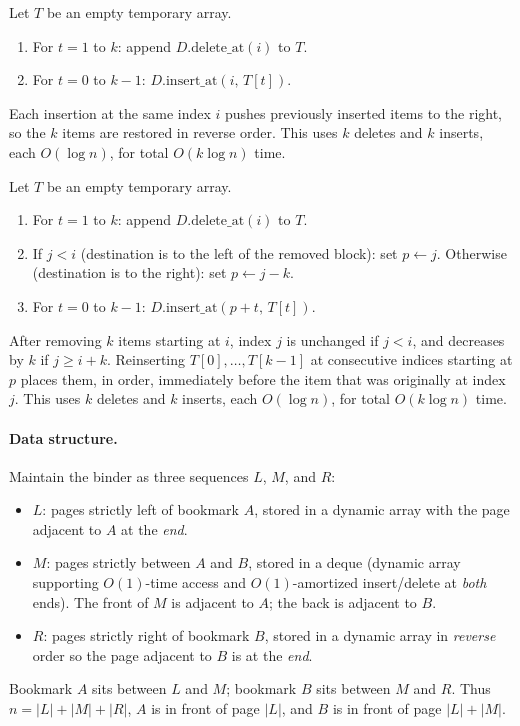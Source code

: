\documentclass[12pt,twoside]{article}
\begin{document}
\begin{problems}
\newpage
\problem  %

\begin{problemparts}
\problempart %
Let $T$ be an empty temporary array.
\begin{enumerate}
    \item For $t = 1$ to $k$: append $D.\mathrm{delete\_at}(i)$ to $T$.
    \item For $t = 0$ to $k-1$: $D.\mathrm{insert\_at}(i,\, T[t])$.
\end{enumerate}
Each insertion at the same index $i$ pushes previously inserted items to the right, so the $k$ items are restored in reverse order.
This uses $k$ deletes and $k$ inserts, each $O(\log n)$, for total $O(k\log n)$ time.

\problempart %
Let $T$ be an empty temporary array.
\begin{enumerate}
    \item For $t = 1$ to $k$: append $D.\mathrm{delete\_at}(i)$ to $T$.
    \item If $j < i$ (destination is to the left of the removed block):
        set $p \leftarrow j$.
        Otherwise (destination is to the right):
        set $p \leftarrow j - k$.
    \item For $t = 0$ to $k-1$: $D.\mathrm{insert\_at}(p + t,\, T[t])$.
\end{enumerate}
After removing $k$ items starting at $i$, index $j$ is unchanged if $j < i$, and decreases by $k$ if $j \ge i+k$.
Reinserting $T[0],\ldots,T[k-1]$ at consecutive indices starting at $p$ places them, in order, immediately before the item that was originally at index $j$.
This uses $k$ deletes and $k$ inserts, each $O(\log n)$, for total $O(k\log n)$ time.
\end{problemparts}

\newpage
\problem  %

\paragraph{Data structure.}
Maintain the binder as three sequences $L$, $M$, and $R$:
\begin{itemize}
    \item $L$: pages strictly left of bookmark $A$, stored in a dynamic array with the page adjacent to $A$ at the {\em end}.
    \item $M$: pages strictly between $A$ and $B$, stored in a deque (dynamic array supporting $O(1)$-time access and $O(1)$-amortized insert/delete at {\em both} ends). The front of $M$ is adjacent to $A$; the back is adjacent to $B$.
    \item $R$: pages strictly right of bookmark $B$, stored in a dynamic array in {\em reverse} order so the page adjacent to $B$ is at the {\em end}.
\end{itemize}
Bookmark $A$ sits between $L$ and $M$; bookmark $B$ sits between $M$ and $R$.
Thus $n = |L| + |M| + |R|$, $A$ is in front of page $|L|$, and $B$ is in front of page $|L|+|M|$.


\end{problems}
\end{document}
